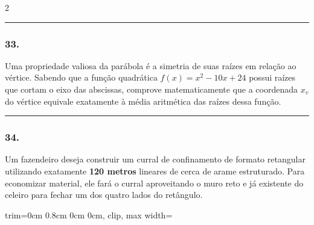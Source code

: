 \documentclass[twoside, 10pt, a4paper]{article}
\newlength{\espacoPreQuestao}
\newlength{\espacoQuestao}
\newlength{\larguraTikz}
\begin{document}
\begin{multicols*}{2}
\noindent\textcolor{CorLinha}{\rule{\linewidth}{0.5pt}} 
\par\vspace{\espacoPreQuestao}
\subsubsection*{33.} Uma propriedade valiosa da parábola é a simetria de suas raízes em relação ao vértice. Sabendo que a função quadrática $f(x) = x^2 - 10x + 24$ possui raízes que cortam o eixo das abscissas, comprove matematicamente que a coordenada $x_v$ do vértice equivale exatamente à média aritmética das raízes dessa função.
\par\vspace{\espacoQuestao}

\noindent\textcolor{CorLinha}{\rule{\linewidth}{0.5pt}} 
\par\vspace{\espacoPreQuestao}
\subsubsection*{34.} Um fazendeiro deseja construir um curral de confinamento de formato retangular utilizando exatamente \textbf{120 metros} lineares de cerca de arame estruturado. Para economizar material, ele fará o curral aproveitando o muro reto e já existente do celeiro para fechar um dos quatro lados do retângulo.

\begin{center}
\begin{adjustbox}{trim=0cm 0.8cm 0cm 0cm, clip, max width=\larguraTikz}
\end{adjustbox}
\end{center}
\end{multicols*}
\end{document}
